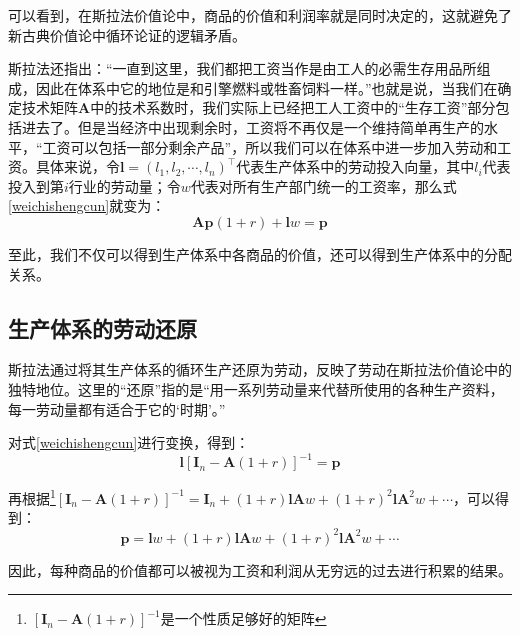 可以看到，在斯拉法价值论中，商品的价值和利润率就是同时决定的，这就避免了新古典价值论中循环论证的逻辑矛盾。

斯拉法还指出：“一直到这里，我们都把工资当作是由工人的必需生存用品所组成，因此在体系中它的地位是和引擎燃料或牲畜饲料一样。”\cite[11]{SiLaFaYongShangPinShengChanShangPinJingJiLiLunPiPanXuLun1963}也就是说，当我们在确定技术矩阵$\bm{A}$中的技术系数时，我们实际上已经把工人工资中的“生存工资”部分包括进去了。但是当经济中出现剩余时，工资将不再仅是一个维持简单再生产的水平，“工资可以包括一部分剩余产品”\cite[11]{SiLaFaYongShangPinShengChanShangPinJingJiLiLunPiPanXuLun1963}，所以我们可以在体系中进一步加入劳动和工资。具体来说，令$\bm{l} = \left( l_1, l_2, \cdots, l_n \right)^\top$代表生产体系中的劳动投入向量，其中$l_i$代表投入到第$i$行业的劳动量；令$w$代表对所有生产部门统一的工资率，那么式\ref{weichishengcun}就变为：
\begin{equation}
    \bm{A} \bm{p} \left( 1 + r \right) + \bm{l} w = \bm{p}
\end{equation}

至此，我们不仅可以得到生产体系中各商品的价值，还可以得到生产体系中的分配关系。

\subsection{生产体系的劳动还原}

斯拉法通过将其生产体系的循环生产还原为劳动，反映了劳动在斯拉法价值论中的独特地位。这里的“还原”指的是“用一系列劳动量来代替所使用的各种生产资料，每一劳动量都有适合于它的‘时期’。”\cite[37]{SiLaFaYongShangPinShengChanShangPinJingJiLiLunPiPanXuLun1963}

对式\ref{weichishengcun}进行变换，得到：
\begin{equation}
    \bm{l}\left[ \bm{I}_n - \bm{A} \left( 1+r \right) \right]^{-1} = \bm{p}
\end{equation}

再根据\footnote{$\left[ \bm{I}_n - \bm{A} \left( 1+r \right) \right]^{-1}$是一个性质足够好的矩阵\cite[89]{pasinettiLecturesTheoryProduction1977}}$\left[ \bm{I}_n - \bm{A} \left( 1+r \right) \right]^{-1} = \bm{I}_n + \left( 1+r \right) \bm{l} \bm{A} w + \left( 1+r \right)^2 \bm{l} \bm{A}^2 w + \cdots $，可以得到：
\begin{equation}
    \bm{p} = \bm{l}w + \left( 1+r \right)\bm{l}\bm{A}w + \left( 1+r \right)^2 \bm{l}\bm{A}^2w + \cdots
\end{equation}

因此，每种商品的价值都可以被视为工资和利润从无穷远的过去进行积累的结果\cite[37-38]{SiLaFaYongShangPinShengChanShangPinJingJiLiLunPiPanXuLun1963}\cite[193]{CaiJiMingCongGuDianZhengZhiJingJiXueDaoZhongGuoTeSeSheHuiZhuYiZhengZhiJingJiXueJiYuZhongGuoShiJiaoDeZhengZhiJingJiXueYanBianShangCe2023}。

